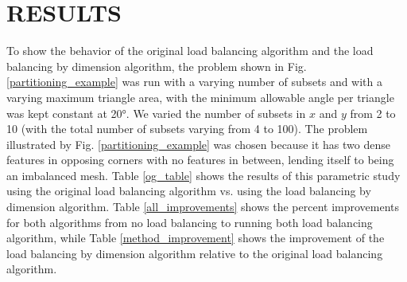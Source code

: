 {\section{RESULTS}

To show the behavior of the original load balancing algorithm and the load balancing by dimension algorithm, the problem shown in Fig. \ref{partitioning_example} was run with a varying number of subsets and with a varying maximum triangle area, with the minimum allowable angle per triangle was kept constant at \ang{20}. We varied the number of subsets in $x$ and $y$ from 2 to 10 (with the total number of subsets varying from 4 to 100). The problem illustrated by Fig. \ref{partitioning_example} was chosen because it has two dense features in opposing corners with no features in between, lending itself to being an imbalanced mesh. Table \ref{og_table} shows the results of this parametric study using the original load balancing algorithm vs. using the load balancing by dimension algorithm. Table \ref{all_improvements} shows the percent improvements for both algorithms from no load balancing to running both load balancing algorithm, while Table \ref{method_improvement} shows the improvement of the load balancing by dimension algorithm relative to the original load balancing algorithm.

}
